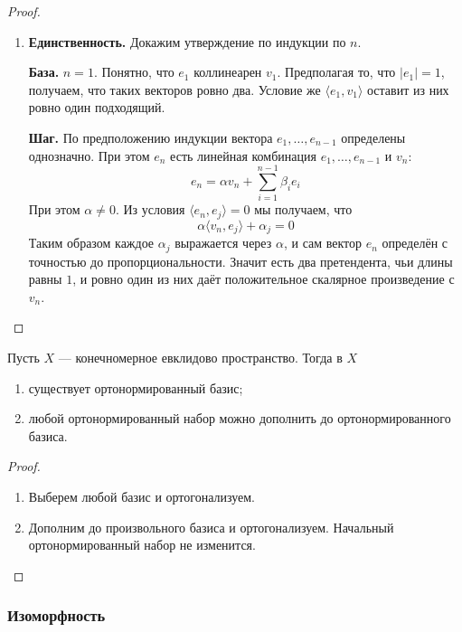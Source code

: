 \documentclass[12pt,a4paper]{article}
\begin{document}
\begin{proof}
\begin{enumerate}
            \item \textbf{Единственность.} Докажим утверждение по индукции по $n$.
                
                \textbf{База.} $n=1$. Понятно, что $e_1$ коллинеарен $v_1$. Предполагая то, что $|e_1| = 1$, получаем, что таких векторов ровно два. Условие же $\langle e_1, v_1 \rangle$ оставит из них ровно один подходящий.

                \textbf{Шаг.} По предположению индукции вектора $e_1, \dots, e_{n-1}$ определены однозначно. При этом $e_n$ есть линейная комбинация $e_1, \dots, e_{n-1}$ и $v_n$:
                \[e_n = \alpha v_n + \sum_{i=1}^{n-1} \beta_i e_i\]
                При этом $\alpha \neq 0$. Из условия $\langle e_n, e_j \rangle = 0$ мы получаем, что
                \[\alpha \langle v_n, e_j \rangle + \alpha_j = 0\]
                Таким образом каждое $\alpha_j$ выражается через $\alpha$, и сам вектор $e_n$ определён с точностью до пропорциональности. Значит есть два претендента, чьи длины равны $1$, и ровно один из них даёт положительное скалярное произведение с $v_n$.
        \end{enumerate}
    \end{proof}

    \begin{corollary}
        Пусть $X$ --- конечномерное евклидово пространство. Тогда в $X$
        \begin{enumerate}
            \item существует ортонормированный базис;
            \item любой ортонормированный набор можно дополнить до ортонормированного базиса.
        \end{enumerate}
    \end{corollary}

    \begin{proof}
        \begin{enumerate}
            \item Выберем любой базис и ортогонализуем.
            \item Дополним до произвольного базиса и ортогонализуем. Начальный ортонормированный набор не изменится.
        \end{enumerate}
    \end{proof}

    \subsubsection{Изоморфность}
\end{document}
